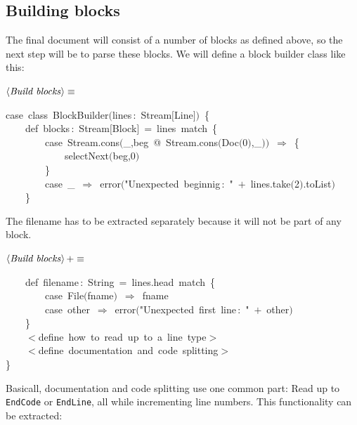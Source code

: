 \documentclass[a4paper,12pt]{article}
\begin{document}
\subsection{Building blocks}
The final document will consist of a number of blocks as defined above,
so the next step will be to parse these blocks. We will define a
block builder class like this:

$\left<\mbox{\emph{Build blocks}}\right>\equiv$
\begin{program}{\vem case}~{\vem class}~BlockBuilder$($lines\,{\rm :}~Stream$[$Line$]$$)$~{\small\{}
\\~~~~{\vem def}~blocks\,{\rm :}~Stream$[$Block$]$~=~lines~{\vem match}~{\small\{}
\\~~~~~~~~{\vem case}~Stream.cons$($\_,beg~@~Stream.cons$($Doc$($0$)$,\_$)$$)$~$\Rightarrow$~{\small\{}
\\~~~~~~~~~~~~selectNext$($beg,0$)$
\\~~~~~~~~{\small\}}
\\~~~~~~~~{\vem case}~\_~$\Rightarrow$~error$($"Unexpected~beginnig\,{\rm :}~"~$+$~lines.take$($2$)$.toList$)$
\\~~~~{\small\}}
\\[0.5em]\end{program}
The filename has to be extracted separately because it will not
be part of any block.

$\left<\mbox{\emph{Build blocks}}\right>+\equiv$
\begin{program}~~~~{\vem def}~filename\,{\rm :}~String~=~lines.head~{\vem match}~{\small\{}
\\~~~~~~~~{\vem case}~File$($fname$)$~$\Rightarrow$~fname
\\~~~~~~~~{\vem case}~other~$\Rightarrow$~error$($"Unexpected~first~line\,{\rm :}~"~$+$~other$)$
\\~~~~{\small\}}
\\[0.5em]~~~~$<$define~how~to~read~up~to~a~line~{\vem type}$>$
\\~~~~$<$define~documentation~and~code~splitting$>$
\\{\small\}}
\\[0.5em]\end{program}
Basicall, documentation and code splitting use one common part:
Read up to \texttt{EndCode} or \texttt{EndLine}, all while incrementing line
numbers. This functionality can be extracted:
\end{document}

